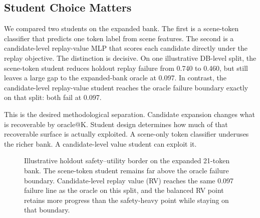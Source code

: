 \documentclass{article}
\begin{document}
\subsection{Student Choice Matters}
\label{sec:exp:student}

We compared two students on the expanded bank. The first is a scene-token classifier that
predicts one token label from scene features. The second is a candidate-level replay-value
MLP that scores each candidate directly under the replay objective. The distinction is
decisive. On one illustrative DB-level split, the scene-token student reduces holdout
replay failure from 0.740 to 0.460, but still leaves a large gap to the expanded-bank
oracle at 0.097. In contrast, the candidate-level replay-value student reaches the oracle
failure boundary exactly on that split: both fail at 0.097.

This is the desired methodological separation. Candidate expansion changes what is
recoverable by oracle@K. Student design determines how much of that recoverable surface is
actually exploited. A scene-only token classifier underuses the richer bank. A
candidate-level value student can exploit it.

\begin{figure}[t]
\centering
{}
\caption{Illustrative holdout safety--utility border on the expanded 21-token bank. The
scene-token student remains far above the oracle failure boundary. Candidate-level replay
value (RV) reaches the same 0.097 failure line as the oracle on this split, and the
balanced RV point retains more progress than the safety-heavy point while staying on that
boundary.}
\label{fig:rv_frontier}
\end{figure}
\end{document}
